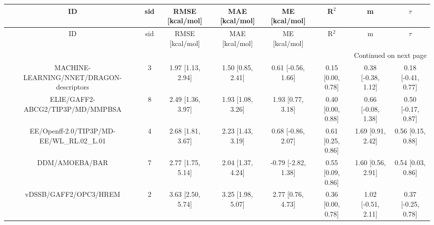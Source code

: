 \documentclass[8pt]{article}
\begin{document}
\begin{center}
\begin{footnotesize}
\begin{longtable}{|cccccccc|}
\toprule
                                       ID & sid &   RMSE [kcal/mol] &    MAE [kcal/mol] &       ME [kcal/mol] &             R$^2$ &                  m &             $\tau$ \\
\midrule
\endfirsthead

\toprule
                                       ID & sid &   RMSE [kcal/mol] &    MAE [kcal/mol] &       ME [kcal/mol] &             R$^2$ &                  m &             $\tau$ \\
\midrule
\endhead
\midrule
\multicolumn{8}{r}{{Continued on next page}} \\
\midrule
\endfoot

\bottomrule
\endlastfoot
 MACHINE-LEARNING/NNET/DRAGON-descriptors &   3 & 1.97 [1.13, 2.94] & 1.50 [0.85, 2.41] &  0.61 [-0.56, 1.66] & 0.15 [0.00, 0.78] & 0.38 [-0.38, 1.12] & 0.18 [-0.41, 0.77] \\
         ELIE/GAFF2-ABCG2/TIP3P/MD/MMPBSA &   8 & 2.49 [1.36, 3.97] & 1.93 [1.08, 3.26] &   1.93 [0.77, 3.18] & 0.40 [0.00, 0.88] & 0.66 [-0.08, 1.38] & 0.50 [-0.17, 0.87] \\
EE/Openff-2.0/TIP3P/MD-EE/WL\_RL.02\_L.01 &   4 & 2.68 [1.81, 3.67] & 2.23 [1.43, 3.19] &  0.68 [-0.86, 2.07] & 0.61 [0.25, 0.86] &  1.69 [0.91, 2.42] &  0.56 [0.15, 0.88] \\
                           DDM/AMOEBA/BAR &   7 & 2.77 [1.75, 5.14] & 2.04 [1.37, 4.24] & -0.79 [-2.82, 1.38] & 0.55 [0.09, 0.86] &  1.60 [0.56, 2.91] &  0.54 [0.03, 0.86] \\
                    vDSSB/GAFF2/OPC3/HREM &   2 & 3.63 [2.50, 5.74] & 3.25 [1.98, 5.07] &   2.77 [0.76, 4.73] & 0.36 [0.00, 0.78] & 1.02 [-0.51, 2.11] & 0.37 [-0.25, 0.78] \\
\end{longtable}
\end{footnotesize}
\end{center}
\end{document}
